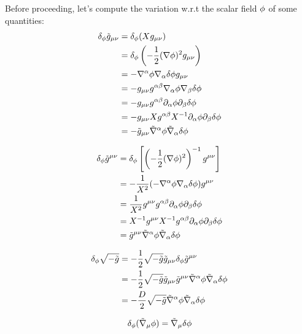 Before proceeding, let's compute the variation w.r.t the scalar field $\phi$ of some quantities:
\begin{align}
  \delta_\phi \tilde{g}_{\mu\nu }&=\delta_\phi (Xg_{\mu\nu })\\
  &=\delta_\phi \left(-\frac{1}{2}(\nabla\phi )^2g_{\mu\nu }\right)\\
  &=-\nabla^\alpha \phi \nabla_\alpha \delta \phi g_{\mu\nu }\\
  &=-g_{\mu\nu }g^{\alpha\beta }\nabla_\alpha\phi\nabla_\beta\delta\phi  \\
  &=-g_{\mu\nu }g^{\alpha\beta }\partial_\alpha\phi\partial_\beta\delta\phi\\
  &=-g_{\mu\nu }Xg^{\alpha\beta }X^{-1}\partial_\alpha\phi\partial_\beta\delta\phi \\
  &=-\tilde{g}_{\mu\nu }\tilde{\nabla}^\alpha \phi\tilde{\nabla}_\alpha\delta\phi 
\end{align}

\begin{align}
  \delta_\phi \tilde{g}^{\mu\nu }&=\delta_\phi\left[\left(-\frac{1}{2}(\nabla\phi )^2\right)^{-1} g^{\mu\nu }\right]\\
  &=-\frac{1}{X^2}(-\nabla^\alpha\phi\nabla_\alpha\delta\phi )g^{\mu\nu }\\
  &=\frac{1}{X^2}g^{\mu\nu }g^{\alpha\beta }\partial_\alpha\phi\partial_\beta\delta\phi \\
  &=X^{-1}g^{\mu\nu }X^{-1}g^{\alpha\beta }\partial_\alpha\phi\partial_\beta\delta\phi \\
  &=\tilde{g}^{\mu\nu }\tilde{\nabla}^\alpha\phi\tilde{\nabla}_\alpha\delta\phi 
\end{align}

\begin{align}
  \delta_\phi \sqrt{-\tilde{g}}&=-\frac{1}{2}\sqrt{-\tilde{g}}\tilde{g}_{\mu\nu } \delta_\phi\tilde{g}^{\mu\nu }\\
  &=-\frac{1}{2}\sqrt{-\tilde{g}}\tilde{g}_{\mu\nu}\tilde{g}^{\mu\nu }\tilde{\nabla}^\alpha\phi\tilde{\nabla}_\alpha\delta\phi \\
  &=-\frac{D}{2}\sqrt{-\tilde{g}}\tilde{\nabla}^\alpha\phi \tilde{\nabla}_\alpha\delta\phi 
\end{align}

\begin{align}
  \delta_\phi (\tilde{\nabla}_\mu \phi)=\tilde{\nabla}_\mu\delta\phi 
\end{align}

